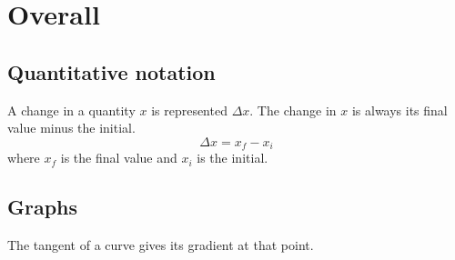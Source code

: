 \section{Overall}
\subsection{Quantitative notation}
A change in a quantity $x$ is represented $\Delta x$. The change in $x$ is always its final value
minus the initial.
$$ \Delta x = x_f - x_i $$
where $x_f$ is the final value and $x_i$ is the initial.

\subsection{Graphs}
The tangent of a curve gives its gradient at that point.

